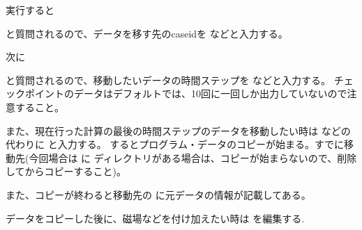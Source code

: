 \documentclass[letterpaper,10pt,dvipdfmx,report]{sphinxmanual}
\begin{document}
\begin{sphinxVerbatim}[commandchars=\\\{\}]
 
\end{sphinxVerbatim}

\sphinxAtStartPar
実行すると

\begin{sphinxVerbatim}[commandchars=\\\{\}]
       
\end{sphinxVerbatim}

\sphinxAtStartPar
と質問されるので、データを移す先のcaseidを  などと入力する。

\sphinxAtStartPar
次に

\begin{sphinxVerbatim}[commandchars=\\\{\}]
         
\end{sphinxVerbatim}

\sphinxAtStartPar
と質問されるので、移動したいデータの時間ステップを  などと入力する。
チェックポイントのデータはデフォルトでは、10回に一回しか出力していないので注意すること。

\sphinxAtStartPar
また、現在行った計算の最後の時間ステップのデータを移動したい時は  などの代わりに
 と入力する。
するとプログラム・データのコピーが始まる。すでに移動先(今回場合は  に  ディレクトリがある場合は、コピーが始まらないので、削除してからコピーすること)。

\sphinxAtStartPar
また、コピーが終わると移動先の  に元データの情報が記載してある。

\sphinxAtStartPar
データをコピーした後に、磁場などを付け加えたい時は  を編集する.
\end{document}
